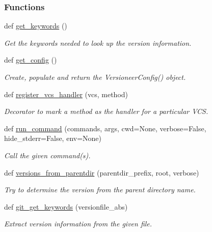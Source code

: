 \subsubsection*{Functions}
\begin{DoxyCompactItemize}
\item 
def \hyperlink{namespacesrc_1_1__version_afdd5bbfefc2bef0d88e1406709fe7541}{get\+\_\+keywords} ()
\begin{DoxyCompactList}\small\item\em Get the keywords needed to look up the version information. \end{DoxyCompactList}\item 
def \hyperlink{namespacesrc_1_1__version_af28ed90f44f99213d839ab63b92be972}{get\+\_\+config} ()
\begin{DoxyCompactList}\small\item\em Create, populate and return the Versioneer\+Config() object. \end{DoxyCompactList}\item 
def \hyperlink{namespacesrc_1_1__version_a0477040e1e7a9284f041925048d8757d}{register\+\_\+vcs\+\_\+handler} (vcs, method)
\begin{DoxyCompactList}\small\item\em Decorator to mark a method as the handler for a particular V\+CS. \end{DoxyCompactList}\item 
def \hyperlink{namespacesrc_1_1__version_a07869f13dacbb2c9659c38961e969824}{run\+\_\+command} (commands, args, cwd=None, verbose=False, hide\+\_\+stderr=False, env=None)
\begin{DoxyCompactList}\small\item\em Call the given command(s). \end{DoxyCompactList}\item 
def \hyperlink{namespacesrc_1_1__version_a8ab6a4b8a5612bba9d90c884f50fce13}{versions\+\_\+from\+\_\+parentdir} (parentdir\+\_\+prefix, root, verbose)
\begin{DoxyCompactList}\small\item\em Try to determine the version from the parent directory name. \end{DoxyCompactList}\item 
def \hyperlink{namespacesrc_1_1__version_a55b4959421edb5200447f5199d19f4c1}{git\+\_\+get\+\_\+keywords} (versionfile\+\_\+abs)
\begin{DoxyCompactList}\small\item\em Extract version information from the given file. \end{DoxyCompactList}\item 

\end{DoxyCompactItemize}
